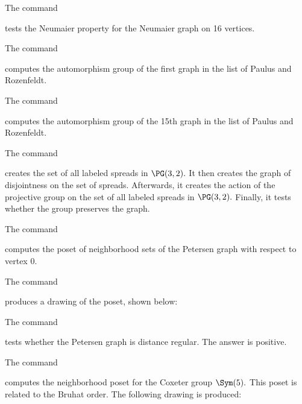 \bigskip

The command 


tests the Neumaier property for the Neumaier graph on 16 vertices.  

\bigskip


The command 


computes the automorphism group of 
the first graph in the list of Paulus and Rozenfeldt.


\bigskip

The command 


computes the automorphism group of 
the 15th graph in the list of Paulus and Rozenfeldt.


\bigskip



The command 


creates the set of all labeled spreads in $\PG(3,2).$ 
It then creates the graph of disjointness on the set of spreads. 
Afterwards, it creates the action of the projective group on the set of all labeled spreads in $\PG(3,2).$ 
Finally, it tests whether the group preserves the graph. 


\bigskip




The command 


computes the poset of neighborhood sets of the Petersen graph with respect to vertex 0.

The command 


produces a drawing of the poset, shown below:


The command 


tests whether the Petersen graph is distance regular. The answer is positive.

\bigskip


The command 


computes the neighborhood poset for the Coxeter group $\Sym(5).$ 
This poset is related to the Bruhat order.
The following drawing is produced:







